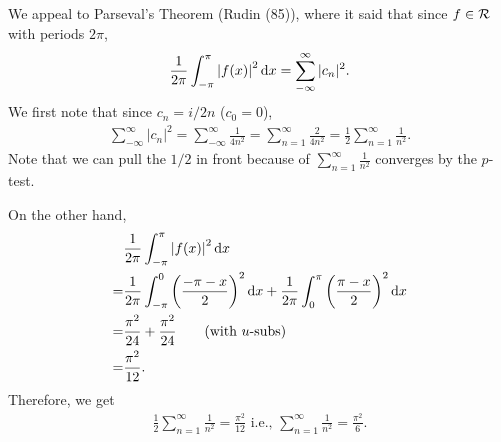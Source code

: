 \documentclass[12pt]{article}
\begin{document}
\begin{fproof}[3(c)]
 We appeal to Parseval's Theorem (Rudin (85)), where it said that since \(f \in \mathcal{R}\) with periods \(2 \pi\),
 \begin{align*}
   \frac{1}{2\pi} \int_{-\pi}^{\pi} \left\lvert f(x) \right\rvert^2 \mathop{}\!\mathrm{d} x = \sum_{-\infty}^{\infty} |c_n|^2.
 \end{align*}
 We first note that since \(c_n = i/2n\) (\(c_0 = 0\)),
 \begin{align*}
   \sum_{-\infty}^{\infty} |c_n|^2 = \sum_{-\infty}^{\infty} \frac{1}{4n^2} = \sum_{n = 1}^{\infty} \frac{2}{4n^2} = \frac{1}{2}\sum_{n=1}^{\infty}\frac{1}{n^2}.
 \end{align*}
 Note that we can pull the \(1/2\) in front because of \(\sum_{n=1}^{\infty}\frac{1}{n^2}\) converges by the \(p\)-test.

 On the other hand,
 \begin{align*}
   &\frac{1}{2\pi} \int_{-\pi}^{\pi} \left\lvert f(x) \right\rvert^2 \mathop{}\!\mathrm{d} x \\
   =& \frac{1}{2\pi} \int_{-\pi}^{0} \left( \frac{-\pi-x}{2} \right)^2 \mathop{}\!\mathrm{d} x + \frac{1}{2\pi} \int_{0}^{\pi} \left( \frac{\pi-x}{2} \right)^2\mathop{}\!\mathrm{d} x\\
   =& \frac{\pi^2}{24} + \frac{\pi^2}{24} \tag{with \(u\)-subs}\\
   =& \frac{\pi^2}{12}.
 \end{align*}
 Therefore, we get
 \begin{align*}
   \frac{1}{2}\sum_{n=1}^{\infty}\frac{1}{n^2} = \frac{\pi^2}{12} \text{ i.e., } \sum_{n=1}^{\infty}\frac{1}{n^2} = \frac{\pi^2}{6}.
 \end{align*}
\end{fproof}
\newpage
\end{document}
